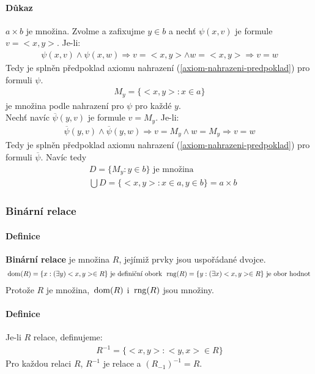 \documentclass[a4paper,12pt,titlepage]{article}
\begin{document}
\paragraph{Důkaz}
$a \times b$ je množina. Zvolme a zafixujme $y \in b$ a
nechť $\psi(x,v)$ je formule $v = <x,y>$. Je-li:
\begin{align}
	\psi(x,v) \land \psi(x,w) \Rightarrow v = <x,y> \land w = <x,y> \Rightarrow
	v = w
\end{align}
Tedy je splněn předpoklad axiomu nahrazení (\ref{axiom-nahrazeni-predpoklad})
pro formuli $\psi$.
\begin{align}
	M_y = \{ <x,y> : x \in a\}
\end{align}
je množina podle nahrazení pro $\psi$ pro každé $y$. \\
Nechť navíc $\overline{\psi}(y,v)$ je formule $v = M_y$. Je-li:
\begin{align}
	\overline{\psi}(y,v) \land \overline{\psi}(y,w) \Rightarrow v = M_y \land w = M_y
	\Rightarrow v = w
\end{align}
Tedy je splněn předpoklad axiomu nahrazení (\ref{axiom-nahrazeni-predpoklad})
pro formuli $\overline{\psi}$. Navíc tedy
\begin{align}
	&D = \{ M_y : y \in b \} \text{ je množina } \\
	&\bigcup D = \{<x,y>: x \in a, y \in b \} = a \times b
\end{align}


\subsubsection{Binární relace}
\setcounter{equation}{0}
\paragraph{Definice}
\textbf{Binární relace} je množina $R$, jejímiž prvky jsou uspořádané dvojce.
\begin{align}
	\operatorname*{\,dom}(R) = \{ x : (\exists y) <x,y> \in R \} \text{ je definiční obork }
	\operatorname*{\,rng}(R) = \{ y : (\exists x) <x,y> \in R \} \text{ je obor hodnot }
\end{align}
Protože $R$ je množina, $\operatorname*{\,dom}(R)$ i $\operatorname*{\,rng}(R)$ jsou množiny.
\paragraph{Definice}
Je-li $R$ relace, definujeme:
\begin{align}
	R^{-1} = \{ <x,y>: <y,x> \in R \}
\end{align}
Pro každou relaci $R$, $R^{-1}$ je relace a $(R_{-1})^{-1} = R$.
\end{document}
